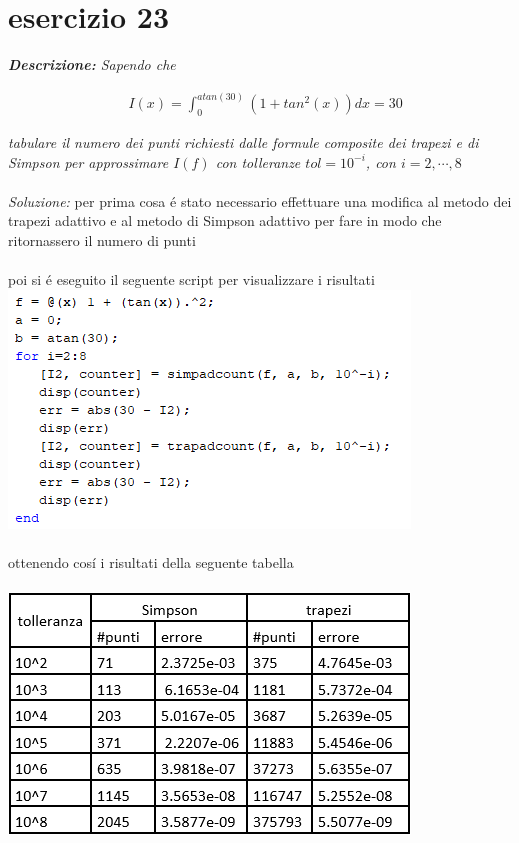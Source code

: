 \section{esercizio 23}
\textit{\textbf{Descrizione:}  Sapendo che}

\begin{equation}
  \begin{aligned}
      & I(x) =\int_{0}^{atan(30)}(1+tan^{2}(x))dx = 30
  \end{aligned}
\end{equation}

\noindent\textit{tabulare il numero dei punti richiesti dalle formule composite dei trapezi e di Simpson per approssimare $I(f)$ con tolleranze $tol=10^{-i}$, con $i = 2,\cdots,8$}
\\~\\
\noindent\emph{Soluzione: }\newline
per prima cosa \'e stato necessario effettuare una modifica al metodo dei trapezi adattivo e al metodo di Simpson adattivo per fare in modo che ritornassero \newline
il numero di punti\\~\\

\newpage
\newpage
poi si \'e eseguito il seguente script per visualizzare i risultati\newline
\includegraphics[width=1\linewidth]{img/ex23}\\~\\
ottenendo cos\'i i risultati della seguente tabella\\~\\
\includegraphics[width=1.3\linewidth]{img/tabella23}
